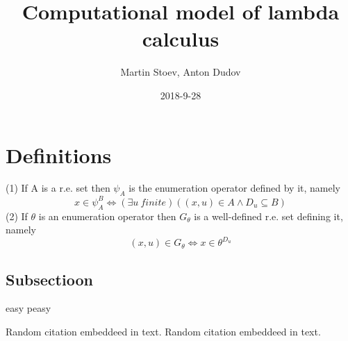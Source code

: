 \documentclass{article}
\title{Computational model of lambda calculus}
\date{2018-9-28}
\author{Martin Stoev, Anton Dudov}
\begin{document}
	\maketitle

	\newpage
	\doublespacing
	\tableofcontents
	\singlespacing

	\newpage

	\section{Definitions}
		\quad 
		(1) If A is a r.e. set then $\psi_A$ is the enumeration operator defined by it, namely
		\begin{equation}
			x \in \psi^B_A \iff (\exists u \: finite) ((x, u) \in A \land D_u \subseteq B)
		\end{equation}
		\quad
		(2) If $\theta$ is an enumeration operator then $G_\theta$ is a well-defined r.e. set defining it, namely
		\begin{equation}
			(x, u) \in G_\theta \iff x \in \theta^{D_u}
		\end{equation}

	\subsection{Subsectioon}
		easy peasy


	Random citation \cite{COM_COOPER} embeddeed in text.
	Random citation \cite{COM_ODIFREDDI} embeddeed in text.

	\newpage
	
	
\end{document}
